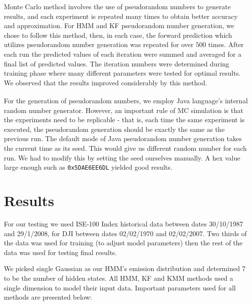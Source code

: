 Monte Carlo method involves the use of pseudorandom numbers to generate results,
and each experiment is repeated many times to obtain better accuracy and
approximation. For HMM and KF pseudorandom number generation, we chose to follow
this method, then, in each case, the forward prediction which utilizes
pseudorandom number generation was repeated for over $500$ times. After each run
the predicted values of each iteration were summed and averaged for a final list
of predicted values. The iteration numbers were determined during training phase
where many different parameters were tested for optimal results. We observed
that the results improved considerably by this method.

For the generation of pseudorandom numbers, we employ Java
\textsuperscript{\textregistered} language's internal random number
generator. However, an important rule of MC simulation is that the experiments
need to be replicable - that is, each time the same experiment is executed, the
pseudorandom generation should be exactly the same as the previous run. The
default mode of Java pseudorandom number generation takes the current time as
its seed. This would give us different random number for each run. We had to
modify this by setting the seed ourselves manually. A hex value large enough
such as \verb!0x5DAE6EE6DL!  yielded good results.


\section{Results}

For our testing we used ISE-100 Index historical data between dates 30/10/1987
and 29/1/2008, for DJI between dates 02/02/1970 and 02/02/2007. Two thirds of
the data was used for training (to adjust model parameters) then the rest of the
data was used for testing final results.

We picked single Gaussian as our HMM's emission distribution and determined 7 to
be the number of hidden states. All HMM, KF and KMM methods used a single
dimension to model their input data. Important parameters used for all methods
are presented below:

